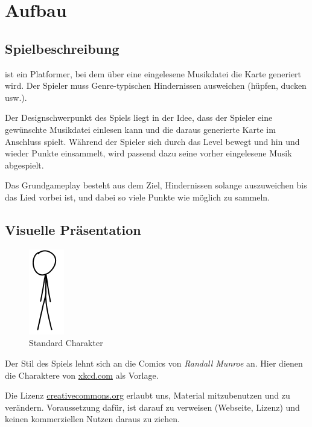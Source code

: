 \documentclass[Skript.tex]{subfiles}
\begin{document}
\section{Aufbau}


\subsection{Spielbeschreibung}

\gname ist ein Platformer, bei dem über eine eingelesene Musikdatei die Karte generiert wird.
Der Spieler muss Genre-typischen Hindernissen ausweichen (hüpfen, ducken usw.).

Der Designschwerpunkt des Spiels liegt in der Idee, dass der Spieler eine gewünschte Musikdatei einlesen kann und die daraus generierte Karte im Anschluss spielt. 
Während der Spieler sich durch das Level bewegt und hin und wieder Punkte einsammelt, wird passend dazu seine vorher eingelesene Musik abgespielt.

Das Grundgameplay besteht aus dem Ziel, Hindernissen solange auszuweichen bis das Lied vorbei ist, und dabei so viele Punkte wie möglich zu sammeln.


\subsection{Visuelle Präsentation}

\begin{figure}
\vspace{-1.2cm}
  \begin{center}
    \includegraphics[scale=.9]{Grafik/char.png}
	\caption{Standard Charakter}
	\label{charakter}
  \end{center}
\end{figure}

Der Stil des Spiels \gname lehnt sich an die Comics von \textit{Randall Munroe} an.
Hier dienen die Charaktere von \href{http://xkcd.com}{xkcd.com} als Vorlage.

Die Lizenz \href{http://creativecommons.org/licenses/by-nc/2.5/}{creativecommons.org} erlaubt uns, Material mitzubenutzen und zu verändern.
Voraussetzung dafür, ist darauf zu verweisen (Webseite, Lizenz) und keinen kommerziellen Nutzen daraus zu ziehen.
\end{document}
